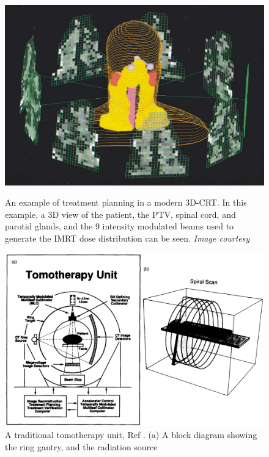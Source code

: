 \documentclass[10pt,journal,compsoc]{IEEEtran} %
\begin{document}
   
  \begin{figure}[htbp!]
    \includegraphics[width=\linewidth]{intro}
    \label{intro}
    \caption{An example of treatment planning in a modern 3D-CRT. In this 
    example, a 3D view of the patient, the PTV, spinal cord, and parotid 
    glands, and the 9 intensity modulated beams used to generate the IMRT dose 
    distribution can be seen. \textit{Image courtesy \cite{IMRT}}}
  \end{figure}
  
  \begin{figure}[t!]
    \centering
  \includegraphics[width=0.89\linewidth]{fig1}
  \caption{A traditional tomotherapy unit, Ref \cite{Mackie1993}. (a) A block 
    diagram showing the ring gantry, and the radiation source}
  \label{fig1}
  
\end{figure}
\end{document}
